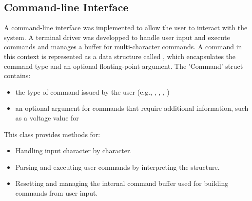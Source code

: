 \subsection{Command-line Interface}

A command-line interface was implemented to allow the user to interact with the system.
A terminal driver was developped to handle user input and execute commands and manages a 
buffer for multi-character commands. A command in this context is represented as a data 
structure called , which encapsulates the command type and an optional 
floating-point argument. The 'Command' struct contains:

\begin{itemize}
    \item the type of command issued by the user (e.g., , , , )
    \item an optional argument for commands that require additional information, such as a voltage value for 
\end{itemize}

This class provides methods for:
\begin{itemize}
    \item Handling input character by character.
    \item Parsing and executing user commands by interpreting the  structure.
    \item Resetting and managing the internal command buffer used for building commands from user input.
\end{itemize}

